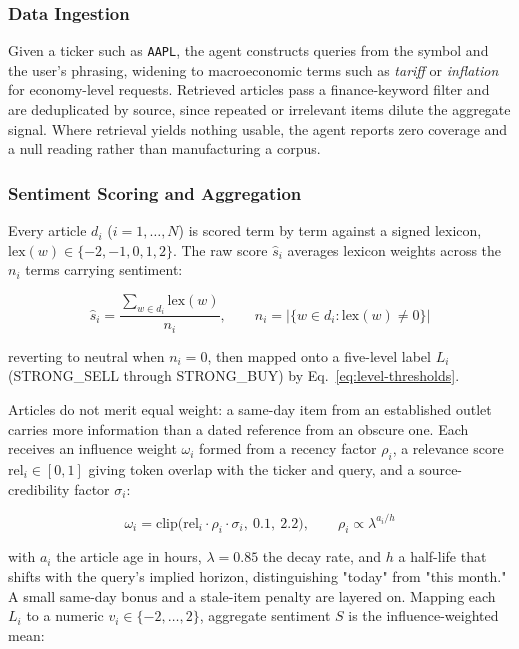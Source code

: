 \documentclass[conference]{IEEEtran}
\begin{document}
\subsubsection{Data Ingestion}

Given a ticker such as \texttt{AAPL}, the agent constructs queries from the symbol and the user's phrasing, widening to macroeconomic terms such as \emph{tariff} or \emph{inflation} for economy-level requests. Retrieved articles pass a finance-keyword filter and are deduplicated by source, since repeated or irrelevant items dilute the aggregate signal. Where retrieval yields nothing usable, the agent reports zero coverage and a null reading rather than manufacturing a corpus.

\subsubsection{Sentiment Scoring and Aggregation}

Every article $d_i$ ($i=1,\dots,N$) is scored term by term against a signed lexicon, $\mathrm{lex}(w)\in\{-2,-1,0,1,2\}$. The raw score $\hat{s}_i$ averages lexicon weights across the $n_i$ terms carrying sentiment:

\begin{equation}
\hat{s}_i = \frac{\sum_{w \in d_i}\mathrm{lex}(w)}{n_i}, \qquad n_i = \bigl|\{w \in d_i : \mathrm{lex}(w)\neq 0\}\bigr|
\end{equation}

reverting to neutral when $n_i=0$, then mapped onto a five-level label $L_i$ (STRONG\_SELL through STRONG\_BUY) by Eq.~\eqref{eq:level-thresholds}.

Articles do not merit equal weight: a same-day item from an established outlet carries more information than a dated reference from an obscure one. Each receives an influence weight $\omega_i$ formed from a recency factor $\rho_i$, a relevance score $\mathrm{rel}_i \in [0,1]$ giving token overlap with the ticker and query, and a source-credibility factor $\sigma_i$:

\begin{equation}
\omega_i = \mathrm{clip}\bigl(\mathrm{rel}_i \cdot \rho_i \cdot \sigma_i,\ 0.1,\ 2.2\bigr), \qquad \rho_i \propto \lambda^{a_i/h}
\end{equation}

with $a_i$ the article age in hours, $\lambda=0.85$ the decay rate, and $h$ a half-life that shifts with the query's implied horizon, distinguishing "today" from "this month." A small same-day bonus and a stale-item penalty are layered on. Mapping each $L_i$ to a numeric $v_i \in \{-2,\dots,2\}$, aggregate sentiment $S$ is the influence-weighted mean:
\end{document}
